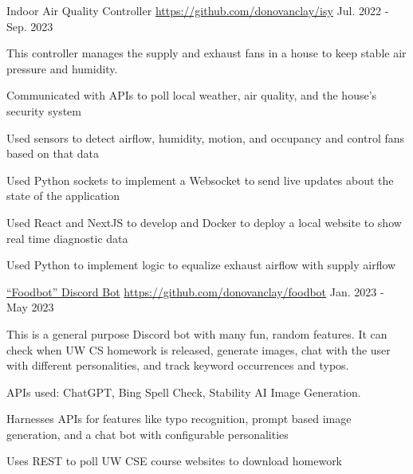 \vspace{\sectionpadding}
\entry
    {Indoor Air Quality Controller}
    {\quad \href{https://github.com/donovanclay/isy}{https://github.com/donovanclay/isy}}
    {Jul. 2022 - Sep. 2023}
    {
        This controller manages the supply and exhaust fans in a house to keep stable air pressure and humidity.
        \begin{condenseditemize}
            \item Communicated with APIs to poll local weather, air quality, and the house's security system

            \item Used sensors to detect airflow, humidity, motion, and occupancy and control fans based on that data
            
            \item Used Python sockets to implement a Websocket to send live updates about the state of the application
            
            \item Used React and NextJS to develop and Docker to deploy a local website to show real time diagnostic data
            
            \item Used Python to implement logic to equalize exhaust airflow with supply airflow
        \end{condenseditemize}
    }

\entry
    {\href{https://github.com/donovanclay/foodbot}{``Foodbot'' Discord Bot}}
    {\quad \href{https://github.com/donovanclay/foodbot}{https://github.com/donovanclay/foodbot}}
    {Jan. 2023 - May 2023}
    {
        This is a general purpose Discord bot with many fun, random features. It can check when UW CS homework is released, generate images, chat with the user with different personalities, and track keyword occurrences and typos.
        
        APIs used: ChatGPT, Bing Spell Check, Stability AI Image Generation.
        \begin{condenseditemize}
            \item Harnesses APIs for features like typo recognition, prompt based image generation, and a chat bot with configurable personalities

            \item Uses REST to poll UW CSE course websites to download homework
        \end{condenseditemize}
    }


